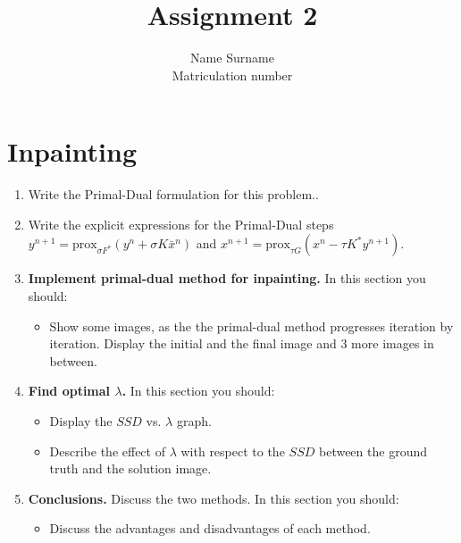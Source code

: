 \documentclass{paper}
\title{Assignment 2}
\author{Name Surname\\Matriculation number}
\begin{document}
\maketitle


%

\section*{Inpainting}


\begin{enumerate}

\item Write the Primal-Dual formulation for this problem..

\item Write the explicit expressions for the Primal-Dual steps $y^{n+1} = \text{prox}_{\sigma F^*} (y^n + \sigma K \bar{x}^n)$ and $x^{n+1} = \text{prox}_{\tau G} (x^n  - \tau K^* y^{n+1})$.


\item \textbf{Implement primal-dual method for inpainting.} In this section you should:

\begin{itemize}
\item Show some images, as the the primal-dual method progresses iteration by iteration. Display the initial and the final image and 3 more images in between.
\end{itemize}
\item \textbf{ Find optimal $\lambda$.} In this section you should:

\begin{itemize}
\item Display the $SSD$ vs. $\lambda$ graph.
\item Describe the effect of $\lambda$ with respect to the $SSD$ between the ground truth and the solution image.
\end{itemize}

\item \textbf{ Conclusions.} Discuss the two methods. In this section you should:
\begin{itemize}
\item Discuss the advantages and disadvantages of each method.
\end{itemize}
\end{enumerate}

 
\end{document}
